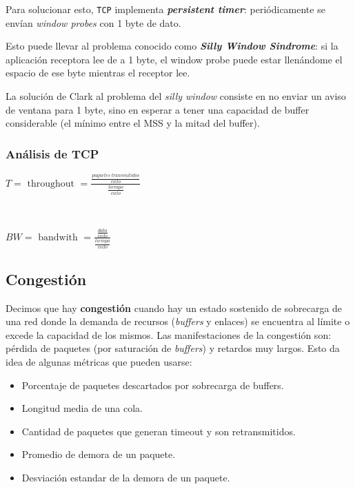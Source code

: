\documentclass[]{article}
\begin{document}
Para solucionar esto, \texttt{TCP} implementa \textbf{\emph{persistent timer}}: periódicamente se envían \emph{window probes} con 1 byte de dato.

Esto puede llevar al problema conocido como \emph{\textbf{Silly Window Sindrome}}: si la aplicación receptora lee de a 1 byte, el window probe puede estar llenándome el espacio de ese byte mientras el receptor lee.



La solución de Clark al problema del \emph{silly window} consiste en no enviar un aviso de ventana para 1 byte, sino en esperar a tener una capacidad de buffer considerable (el mínimo entre el MSS y la mitad del buffer).

\subsubsection{Análisis de TCP}
\begin{center}
    $\displaystyle T = \text{ throughout } = \frac{\displaystyle \frac{paquetes\ transmitidos}{ciclo}}{\displaystyle \frac{tiempo}{ciclo}}$
\end{center}

~\newline

\begin{center}
    $\displaystyle BW = \text{ bandwith } = \frac{\displaystyle \frac{data}{ciclo}}{\displaystyle \frac{tiempo}{ciclo}}$
\end{center}

\subsection{Congestión}
Decimos que hay \textbf{congestión} cuando hay un estado sostenido de sobrecarga de una red donde la demanda de recursos (\emph{buffers} y enlaces) se encuentra al límite o excede la capacidad de los mismos. Las manifestaciones de la congestión son: pérdida de paquetes (por saturación de \emph{buffers}) y retardos muy largos. Esto da idea de algunas métricas que pueden usarse:
\begin{itemize}
    \item Porcentaje de paquetes descartados por sobrecarga de buffers.
    \item Longitud media de una cola.
    \item Cantidad de paquetes que generan timeout y son retransmitidos.
    \item Promedio de demora de un paquete.
    \item Desviación estandar de la demora de un paquete.
\end{itemize}
\end{document}
